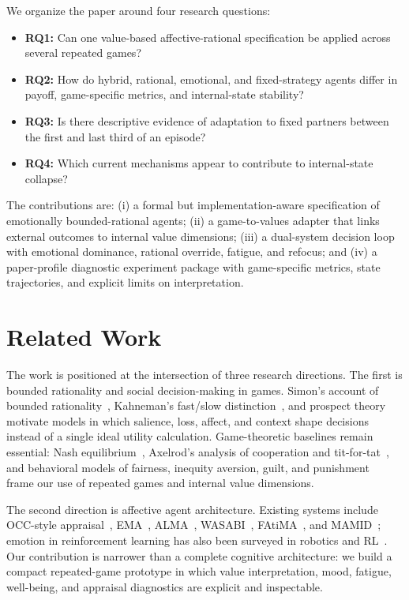 \documentclass[runningheads]{llncs}
\begin{document}
We organize the paper around four research questions:
\begin{itemize}
    \item \textbf{RQ1:} Can one value-based affective-rational specification be applied across several repeated games?
    \item \textbf{RQ2:} How do hybrid, rational, emotional, and fixed-strategy agents differ in payoff, game-specific metrics, and internal-state stability?
    \item \textbf{RQ3:} Is there descriptive evidence of adaptation to fixed partners between the first and last third of an episode?
    \item \textbf{RQ4:} Which current mechanisms appear to contribute to internal-state collapse?
\end{itemize}

The contributions are: (i) a formal but implementation-aware specification of emotionally bounded-rational agents; (ii) a game-to-values adapter that links external outcomes to internal value dimensions; (iii) a dual-system decision loop with emotional dominance, rational override, fatigue, and refocus; and (iv) a paper-profile diagnostic experiment package with game-specific metrics, state trajectories, and explicit limits on interpretation.

\section{Related Work}

The work is positioned at the intersection of three research directions. The first is bounded rationality and social decision-making in games. Simon's account of bounded rationality~\cite{simon1955behavioral}, Kahneman's fast/slow distinction~\cite{kahneman2011thinking}, and prospect theory~\cite{kahneman1979prospect} motivate models in which salience, loss, affect, and context shape decisions instead of a single ideal utility calculation. Game-theoretic baselines remain essential: Nash equilibrium~\cite{nash1950equilibrium}, Axelrod's analysis of cooperation and tit-for-tat~\cite{axelrod1984evolution}, and behavioral models of fairness, inequity aversion, guilt, and punishment~\cite{guth1982ultimatum,fehr1999theory,rabin1993fairness,battigalli2007guilt,battigalli2022belief,fehr2002punishment} frame our use of repeated games and internal value dimensions.

The second direction is affective agent architecture. Existing systems include OCC-style appraisal~\cite{ortony1988cognitive}, EMA~\cite{marsella2009ema}, ALMA~\cite{gebhard2005alma}, WASABI~\cite{beckerasano2010wasabi}, FAtiMA~\cite{dias2014fatima}, and MAMID~\cite{hudlicka2004mamid}; emotion in reinforcement learning has also been surveyed in robotics and RL~\cite{moerland2018emotion}. Our contribution is narrower than a complete cognitive architecture: we build a compact repeated-game prototype in which value interpretation, mood, fatigue, well-being, and appraisal diagnostics are explicit and inspectable.
\end{document}

